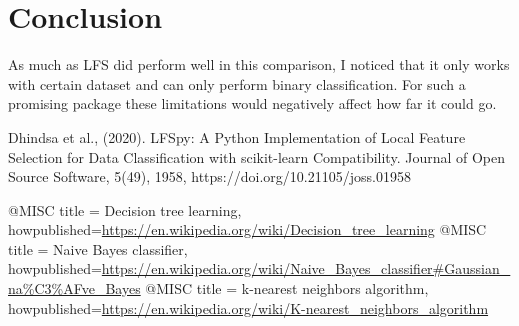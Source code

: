 \documentclass[pdftex,10px,a4paper,oneside]{article}
\begin{document}
\section{Conclusion}
As much as LFS did perform well in this comparison, I noticed that it only works with certain dataset and can only perform binary classification. For such a promising package these limitations would negatively affect how far it could go.
\begin{thebibliography}{9}
Dhindsa et al., (2020). LFSpy: A Python Implementation of Local Feature Selection for Data Classification with scikit-learn Compatibility. Journal of Open Source Software, 5(49), 1958, https://doi.org/10.21105/joss.01958

@MISC{
title = {Decision tree learning},
howpublished={\url{https://en.wikipedia.org/wiki/Decision_tree_learning}}
}
@MISC{
title = {Naive Bayes classifier},
howpublished={\url{https://en.wikipedia.org/wiki/Naive_Bayes_classifier#Gaussian_na%C3%AFve_Bayes}}
}
@MISC{
title = {k-nearest neighbors algorithm},
howpublished={\url{https://en.wikipedia.org/wiki/K-nearest_neighbors_algorithm}}
}

\end{thebibliography}
\end{document}
